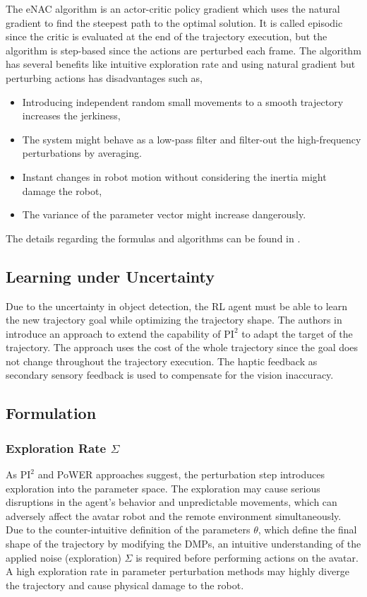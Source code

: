\documentclass[letterpaper, 10 pt, conference]{ieeeconf}  %
\begin{document}
\noindent
The eNAC algorithm \cite{enac} is an actor-critic policy gradient which uses the natural gradient to find the steepest path to the optimal solution. It is called episodic since the critic is evaluated at the end of the trajectory execution, but the algorithm is step-based since the actions are perturbed each frame. The algorithm has several benefits like intuitive exploration rate and using natural gradient but 
perturbing actions has disadvantages \cite{freek:hal-00922132} such as,
\begin{itemize}
    \item Introducing independent random small movements to a smooth trajectory increases the jerkiness,
    \item The system might behave as a low-pass filter and filter-out the high-frequency perturbations by averaging.
    \item Instant changes in robot motion without considering the inertia might damage the robot,
    \item The variance of the parameter vector might increase dangerously.
\end{itemize}
The details regarding the formulas and algorithms can be found in \cite{enac, MainPI2,PowerAlgorithm}.

\subsection{Learning under Uncertainty}
Due to the uncertainty in object detection, the RL agent must be able to learn the new trajectory goal while optimizing the trajectory shape. 
The authors in \cite{freekpi2} introduce an approach to extend the capability of $\textrm{PI}^2$ to adapt the target of the trajectory. The approach uses the cost of the whole trajectory since the goal does not change throughout the trajectory execution. The haptic feedback as secondary sensory feedback is used to compensate for the vision inaccuracy. 

\noindent
\subsection*{Formulation}
\subsubsection{Exploration Rate $\Sigma$}
As $\textrm{PI}^2$ and PoWER approaches suggest, the perturbation step introduces exploration into the parameter space. The exploration may cause serious disruptions in the agent's behavior and unpredictable movements, which can adversely affect the avatar robot and the remote environment simultaneously. Due to the counter-intuitive definition of the parameters $\theta$, which define the final shape of the trajectory by modifying the DMPs, an intuitive understanding of the applied noise (exploration) $\Sigma$ is required before performing actions on the avatar. A high exploration rate in parameter perturbation methods may highly diverge the trajectory and cause physical damage to the robot.
\end{document}
